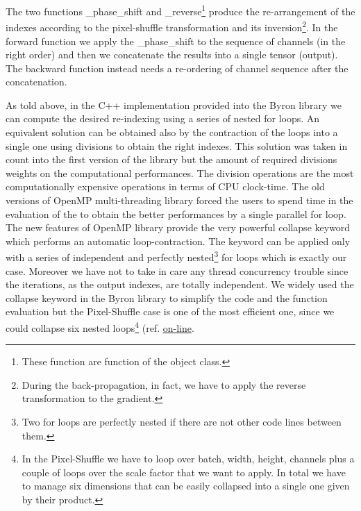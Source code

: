 \documentclass{standalone}
\begin{document}
The two functions \textsf{\_phase\_shift} and \textsf{\_reverse}\footnote{
  These function are  function of the object class.
}
produce the re-arrangement of the indexes according to the pixel-shuffle transformation and its inversion\footnote{
  During the back-propagation, in fact, we have to apply the reverse transformation to the gradient.
}.
In the forward function we apply the \textsf{\_phase\_shift} to the sequence of channels (in the right order) and then we concatenate the results into a single tensor (output).
The backward function instead needs a re-ordering of channel sequence after the concatenation.

As told above, in the \textsf{C++} implementation provided into the \textsf{Byron} library we can compute the desired re-indexing using a series of nested for loops.
An equivalent solution can be obtained also by the contraction of the loops into a single one using divisions to obtain the right indexes.
This solution was taken in count into the first version of the library but the amount of required divisions weights on the computational performances.
The division operations are the most computationally expensive operations in terms of CPU clock-time.
The old versions of OpenMP multi-threading library forced the users to spend time in the evaluation of the  to obtain the better performances by a single parallel for loop.
The new features of OpenMP library provide the very powerful \textsf{collapse} keyword which performs an automatic loop-contraction.
The keyword can be applied only with a series of independent and perfectly nested\footnote{
  Two for loops are perfectly nested if there are not other code lines between them.
}
for loops which is exactly our case.
Moreover we have not to take in care any thread concurrency trouble since the iterations, as the output indexes, are totally independent.
We widely used the \textsf{collapse} keyword in the \textsf{Byron} library to simplify the code and the function evaluation but the Pixel-Shuffle case is one of the most efficient one, since we could collapse six nested loops\footnote{
  In the Pixel-Shuffle we have to loop over batch, width, height, channels plus a couple of loops over the scale factor that we want to apply.
  In total we have to manage six dimensions that can be easily collapsed into a single one given by their product.
} (ref. \href{https://github.com/Nico-Curti/Byron/blob/master/src/shuffler_layer.cpp}{on-line}.
\end{document}
